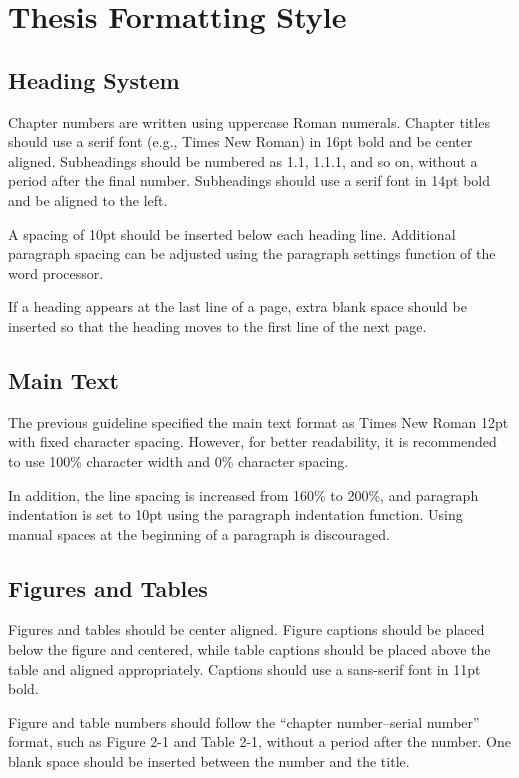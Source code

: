 \section{Thesis Formatting Style}

\subsection{Heading System}

Chapter numbers are written using uppercase Roman numerals. Chapter titles should use a serif font (e.g., Times New Roman) in 16pt bold and be center aligned. Subheadings should be numbered as 1.1, 1.1.1, and so on, without a period after the final number. Subheadings should use a serif font in 14pt bold and be aligned to the left.

A spacing of 10pt should be inserted below each heading line. Additional paragraph spacing can be adjusted using the paragraph settings function of the word processor.

If a heading appears at the last line of a page, extra blank space should be inserted so that the heading moves to the first line of the next page.

\subsection{Main Text}

The previous guideline specified the main text format as Times New Roman 12pt with fixed character spacing. However, for better readability, it is recommended to use 100\% character width and 0\% character spacing.

In addition, the line spacing is increased from 160\% to 200\%, and paragraph indentation is set to 10pt using the paragraph indentation function. Using manual spaces at the beginning of a paragraph is discouraged.

\subsection{Figures and Tables}

Figures and tables should be center aligned. Figure captions should be placed below the figure and centered, while table captions should be placed above the table and aligned appropriately. Captions should use a sans-serif font in 11pt bold.

Figure and table numbers should follow the ``chapter number--serial number'' format, such as Figure 2-1 and Table 2-1, without a period after the number. One blank space should be inserted between the number and the title.

